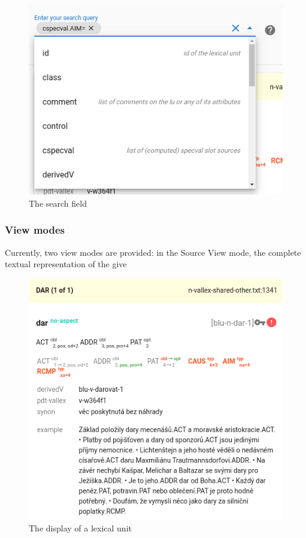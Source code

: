 \documentclass[10pt, a4paper]{article}
\begin{document}
\begin{figure}
    \includegraphics[width=\hsize]{images/ui-search.png}
    \caption{\label{fig:ui-search}The search field}
\end{figure}

\subsubsection{View modes}
Currently, two view modes are provided:
in the Source View mode, the complete textual representation of the give

\begin{figure}
    \includegraphics[width=\hsize]{images/ui-lexical-unit.png}
    \caption{\label{fig:ui-lexical-unit}The display of a lexical unit}
\end{figure}
\end{document}
